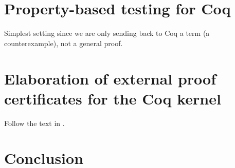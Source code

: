 \documentclass[a4paper,USenglish,cleveref, autoref, thm-restate]{lipics-v2019}
\begin{document}
\section{Property-based testing for Coq}

Simplest setting since we are only sending back to Coq a term (a
counterexample), not a general proof.  


\section{Elaboration of external proof certificates for the Coq
  kernel}

Follow the text in \cite{blanco20coq}.


\section{Conclusion}



\end{document}
